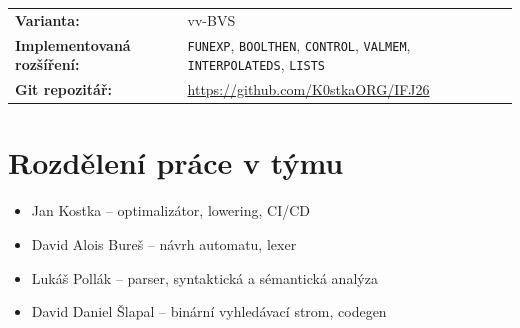 \documentclass[11pt,a4paper]{article}
\begin{document}
\begin{titlepage}
  \vspace{2cm}

  \begin{tabular}{ll}
    \textbf{Varianta:} & vv-BVS \\
    \textbf{Implementovaná rozšíření:} & \texttt{FUNEXP}, \texttt{BOOLTHEN}, \texttt{CONTROL}, \texttt{VALMEM}, \texttt{INTERPOLATEDS}, \texttt{LISTS} \\
    \textbf{Git repozitář:} & \url{https://github.com/K0stkaORG/IFJ26} \\
  \end{tabular}

  \vfill
  \makeatletter
  {\large \@date\par}
  \makeatother
\end{titlepage}

\tableofcontents
\newpage

\section{Rozdělení práce v týmu}

\begin{itemize}
  \item Jan Kostka -- optimalizátor, lowering, CI/CD
  \item David Alois Bureš -- návrh automatu, lexer
  \item Lukáš Pollák -- parser, syntaktická a sémantická analýza
  \item David Daniel Šlapal -- binární vyhledávací strom, codegen
\end{itemize}


\end{document}
